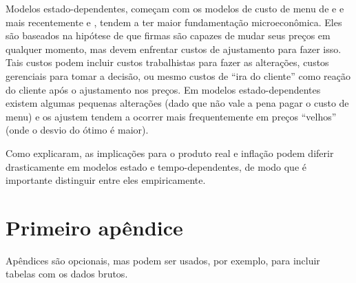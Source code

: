 \documentclass[twoside,a4paper,11pt]{report}
\begin{document}
Modelos estado-dependentes, começam com os modelos de custo de menu de \citet{barro1972theory} e \citet{sheshinski1977inflation} e mais recentemente \citet{dotsey1999state} e \citet{golosov2007menu}, tendem a ter maior fundamentação microeconômica. Eles são baseados na hipótese de que firmas são capazes de mudar seus preços em qualquer momento, mas devem enfrentar custos de ajustamento para fazer isso. Tais custos podem incluir custos trabalhistas para fazer as alterações, custos gerenciais para tomar a decisão, ou mesmo custos de “ira do cliente” como reação do cliente após o ajustamento nos preços. Em modelos estado-dependentes existem algumas pequenas alterações (dado que não vale a pena pagar o custo de menu) e os ajustem tendem a ocorrer mais frequentemente em preços “velhos” (onde o desvio do ótimo é maior).

Como \citet{klenow2008state} explicaram, as implicações para o produto real e inflação podem diferir drasticamente em modelos estado e tempo-dependentes, de modo que é importante distinguir entre eles empiricamente. 








\appendix

\chapter{Primeiro apêndice}\label{ap2}

Apêndices são opcionais, mas podem ser usados, por exemplo, para incluir tabelas com os dados brutos.

\end{document}
